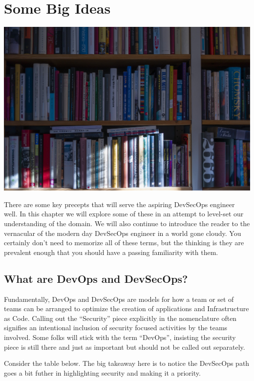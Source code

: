 \chapter{Some Big Ideas}

\centering
\includegraphics{../images/book-5104342_1920.jpg}

\justify{}
There are some key precepts that will serve the aspiring DevSecOps engineer well. In this
chapter we will explore some of these in an attempt to level-set our understanding of the
domain. We will also continue to introduce the reader to the vernacular of the modern day
DevSecOps engineer in a world gone cloudy. You certainly don't need to memorize all of 
these terms, but the thinking is they are prevalent enough that you should have a passing 
familiarity with them.

\section{What are DevOps and DevSecOps?}

\justify{}
Fundamentally, DevOps and DevSecOps are models for how a team or set of teams can be arranged
to optimize the creation of applications and Infrastructure as Code. Calling out the ``Security''
piece explicitly in the nomenclature often signifies an intentional inclusion of security focused
activities by the teams involved. Some folks will stick with the term ``DevOps'', insisting the
security piece is still there and just as important but should not be called out separately.

\justify{}
Consider the table below. The big takeaway here is to notice the DevSecOps path goes a bit futher
in highlighting security and making it a priority.

